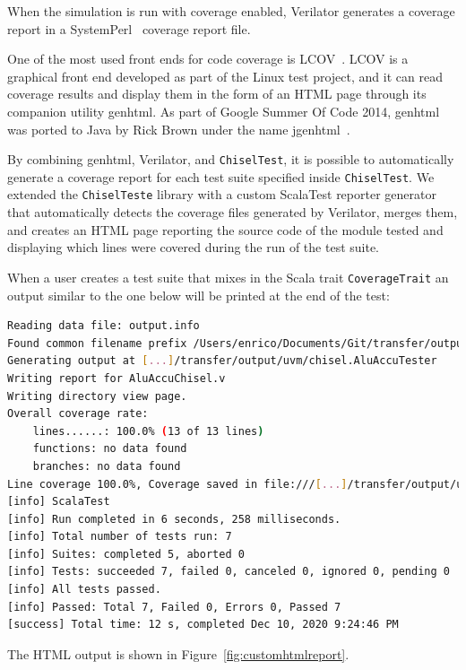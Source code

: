 \documentclass[runningheads]{llncs}
\begin{document}
When the simulation is run with coverage enabled, Verilator generates a coverage report in a SystemPerl~\cite{SystemPerl} coverage report file.

One of the most used front ends for code coverage is LCOV~\cite{Lcov}. LCOV is a graphical front end developed as part of the Linux test project, and it can read coverage results and display them in the form of an HTML page through its companion utility genhtml. As part of Google Summer Of Code 2014, genhtml was ported to Java by Rick Brown under the name jgenhtml~\cite{jgenhtml}.

By combining genhtml, Verilator, and \texttt{ChiselTest}, it is possible to automatically generate a coverage report for each test suite specified inside \texttt{ChiselTest}. We extended the \texttt{ChiselTeste} library with a custom ScalaTest reporter generator that automatically detects the coverage files generated by Verilator, merges them, and creates an HTML page reporting the source code of the module tested and displaying which lines were covered during the run of the test suite.

When a user creates a test suite that mixes in the Scala trait \texttt{CoverageTrait} an output similar to the one below will be printed at the end of the test:
\begin{lstlisting}[language=bash]
Reading data file: output.info
Found common filename prefix /Users/enrico/Documents/Git/transfer/output/uvm/
Generating output at [...]/transfer/output/uvm/chisel.AluAccuTester
Writing report for AluAccuChisel.v
Writing directory view page.
Overall coverage rate:
	lines......: 100.0% (13 of 13 lines)
	functions: no data found
	branches: no data found
Line coverage 100.0%, Coverage saved in file:///[...]/transfer/output/uvm/chisel.AluAccuTester/VerilatorCoverage.html
[info] ScalaTest
[info] Run completed in 6 seconds, 258 milliseconds.
[info] Total number of tests run: 7
[info] Suites: completed 5, aborted 0
[info] Tests: succeeded 7, failed 0, canceled 0, ignored 0, pending 0
[info] All tests passed.
[info] Passed: Total 7, Failed 0, Errors 0, Passed 7
[success] Total time: 12 s, completed Dec 10, 2020 9:24:46 PM
\end{lstlisting}

The HTML output is shown in Figure~\ref{fig:customhtmlreport}.
\end{document}
